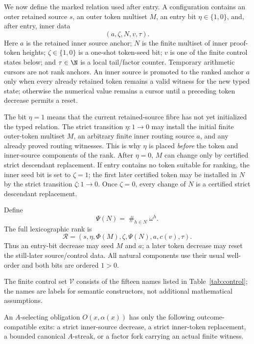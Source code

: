 We now define the marked relation used after entry. A configuration contains
an outer retained source $s$, an outer token multiset $M$, an entry bit
$\eta\in\{1,0\}$, and, after entry, inner data
\[
  (a,\zeta,N,v,\tau).
\]
Here $a$ is the retained inner source anchor; $N$ is the finite multiset of
inner proof-token heights; $\zeta\in\{1,0\}$ is a one-shot token-seed bit;
$v$ is one of the finite control states below; and $\tau\in\N$ is a local
tail/factor counter. Temporary arithmetic cursors are not rank anchors. An inner source is promoted to the ranked anchor $a$ only when every already retained token remains a valid witness for the new typed state; otherwise the numerical value remains a cursor until a preceding token decrease permits a reset.

The bit $\eta=1$ means that the current retained-source fibre has not yet
initialized the typed relation. The strict transition $\eta:1\to0$ may
install the initial finite outer-token multiset $M$, an arbitrary finite inner
routing source $a$, and any already proved routing witnesses. This is why
$\eta$ is placed \emph{before} the token and inner-source components of the
rank. After $\eta=0$, $M$ can change only by certified strict descendant
replacement. If entry contains no token suitable for ranking, the inner
seed bit is set to $\zeta=1$; the first later certified token may be installed
in $N$ by the strict transition $\zeta:1\to0$. Once $\zeta=0$, every change of
$N$ is a certified strict descendant replacement.

Define
\[
  \Psi(N)=\mathop{\#}_{h\in N}\omega^h.
\]
The full lexicographic rank is
\begin{equation}\label{eq:full-rank}
  \mathcal R=(s,\eta,\Phi(M),\zeta,\Psi(N),a,c(v),\tau).
\end{equation}
Thus an entry-bit decrease may seed $M$ and $a$; a later token decrease may
reset the still-later source/control data. All natural components use their
usual well-order and both bits are ordered $1>0$.

The finite control set $\mathcal V$ consists of the fifteen names listed in Table~\ref{tab:control}; the names are labels for semantic constructors, not additional mathematical assumptions.

\begin{lemma}\label{lem:a-routing}
An $A$-selecting obligation $O(x,\alpha(x))$ has only the following
outcome-compatible exits: a strict inner-source decrease, a strict inner-token
replacement, a bounded canonical $A$-streak, or a factor fork carrying an
actual finite witness.
\end{lemma}

